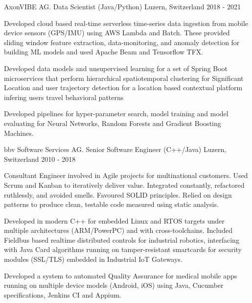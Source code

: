 \begin{cventries}
\cventry
  {AxonVIBE AG.} %
  {Data Scientist (Java/Python)} %
  {Luzern, Switzerland} %
  {2018 - 2021} %
  {
    \begin{cvitems} %
      \item {
          Developed cloud based real-time serverless time-series data ingestion 
          from mobile device sensors (GPS/IMU) using AWS Lambda and Batch. These 
          provided sliding window feature extraction, data-monitoring, and anomaly 
          detection for building ML models and used Apache Beam and Tensorflow TFX.}
      \item {
          Developed data models and unsupervised learning for a set of Spring Boot 
          microservices that perform hierarchical spatiotemporal clustering for 
          Significant Location and user trajectory detection for a location based 
          contextual platform infering users travel behavioral patterns}
      \item {
          Developed pipelines for hyper-parameter search, model training and model 
          evaluating for Neural Networks, Random Forests and Gradient Boosting Machines.}
    \end{cvitems}
  }

\cventry
{bbv Software Services AG.} %
{Senior Software Engineer (C++/Java)} %
{Luzern, Switzerland} %
{2010 - 2018} %
{
  \begin{cvitems} %
    \item {
        Consultant Engineer involved in Agile projects for multinational
        customers. Used Scrum and Kanban to iteratively deliver 
        value. Integrated constantly, refactored ruthlessly, and avoided smells. 
        Favoured SOLID principles. Relied on design patterns to produce clean, 
        testable code measured using static analysis.
        }
    \item {
      Developed in modern C++ for embedded Linux and RTOS targets under
      multiple architectures (ARM/PowerPC) and with cross-toolchains. Included 
      Fieldbus based realtime distributed controls for industrial robotics, 
      interfacing with Java Card algorithms running on tamper-resistant smartcards 
      for security modules (SSL/TLS) embedded in Industrial IoT Gateways.}
    \item {
      Developed a system to automated Quality Assurance for medical mobile apps
      running on multiple device models (Android, iOS) using Java, Cucumber specifications, Jenkins CI and Appium. 
      }  
  \end{cvitems}
}


\end{cventries}
